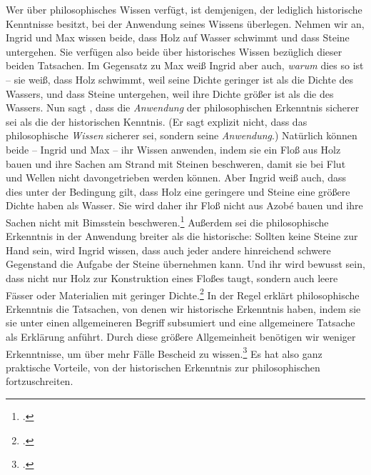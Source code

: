 Wer über philosophisches Wissen verfügt, ist demjenigen, der lediglich
historische Kenntnisse besitzt, bei der Anwendung seines Wissens überlegen.
Nehmen wir an, Ingrid und Max wissen beide, dass Holz auf Wasser schwimmt und dass Steine
untergehen. Sie verfügen also beide über historisches Wissen bezüglich dieser
beiden Tatsachen. Im Gegensatz zu Max weiß Ingrid aber auch, \emph{warum} dies
so ist -- sie weiß, dass Holz schwimmt, weil seine Dichte geringer ist als die
Dichte des Wassers, und dass Steine untergehen, weil ihre Dichte größer ist als
die des Wassers. Nun sagt
, dass die
\emph{Anwendung} der philosophischen Erkenntnis sicherer sei als die der
historischen Kenntnis. (Er sagt explizit nicht, dass das philosophische
\emph{Wissen} sicherer sei, sondern seine \emph{Anwendung}.) Natürlich können
beide -- Ingrid und Max -- ihr Wissen anwenden, indem sie ein Floß aus Holz
bauen und ihre Sachen am Strand mit Steinen beschweren, damit sie bei Flut und
Wellen nicht davongetrieben werden können. Aber Ingrid weiß auch, dass dies
unter der Bedingung gilt, dass Holz eine geringere und Steine eine größere
Dichte haben als Wasser. Sie wird daher ihr Floß nicht aus Azob{\'e} bauen und
ihre Sachen nicht mit Bimsstein
beschweren.\footcite[Vgl.][\S~41]{Wolff:Discursuspraeliminarisdephilosophiaingenere1996}
Außerdem sei die philosophische Erkenntnis in der Anwendung breiter als die
historische: Sollten keine Steine zur Hand sein, wird Ingrid wissen, dass auch
jeder andere hinreichend schwere Gegenstand die Aufgabe der Steine übernehmen
kann. Und ihr wird bewusst sein, dass nicht nur Holz zur Konstruktion eines
Floßes taugt, sondern auch leere Fässer oder Materialien mit geringer
Dichte.\footcite[Vgl.][\S~42]{Wolff:Discursuspraeliminarisdephilosophiaingenere1996}
In der Regel erklärt philosophische Erkenntnis die Tatsachen, von denen wir
historische Erkenntnis haben, indem sie sie unter einen allgemeineren Begriff
subsumiert und eine allgemeinere Tatsache als Erklärung anführt. Durch diese
größere Allgemeinheit benötigen wir weniger Erkenntnisse, um über mehr Fälle
Bescheid zu
wissen.\footcite[Vgl.][\S~43]{Wolff:Discursuspraeliminarisdephilosophiaingenere1996}
Es hat also ganz praktische Vorteile, von der historischen Erkenntnis zur
philosophischen fortzuschreiten.


